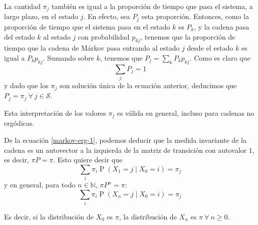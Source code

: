 \documentclass[11pt]{article}
\theoremstyle{plain}
\theoremstyle{definition}
\theoremstyle{remark}
\newcommand{\proba}{\ensuremath{\operatorname{P}}}  %
\newcommand{\espm}[0]{\ensuremath{\mathcal{S}}}  %
\newcommand{\foralle}{\ensuremath{\forall \ }}  %
\begin{document}
    La cantidad $\pi_j$ también es igual a la proporción de tiempo que pasa el sistema, a largo plazo, en el estado $j$. En efecto, sea $P_j$ esta proporción. Entonces, como la proporción de tiempo que el sistema pasa en el estado $k$ es $P_k$, y la cadena pasa del estado $k$ al estado $j$ con probabilidad $p_{kj}$, tenemos que la proporción de tiempo que la cadena de Márkov pasa entrando al estado $j$ desde el estado $k$ es igual a $P_k p_{kj}$. Sumando sobre $k$, tenemos que $P_j = \sum_k P_k p_{kj}$. Como es claro que
    \[ \sum_j P_j = 1 \]
    y dado que los $\pi_j$ son solución única de la ecuación anterior, deducimos que $P_j = \pi_j \ \foralle j \in \espm$.
    
    Esta interpretación de los valores $\pi_j$ es válida en general, incluso para cadenas no ergódicas.

    De la ecuación \eqref{markov-erg-1}, podemos deducir que la medida invariante de la cadena es un autovector a la izquierda de la matriz de transición con autovalor $1$, es decir, $ \pi P = \pi $. Esto quiere decir que
    \[ \sum_i \pi_i \proba(X_1 = j \mid X_0 = i) = \pi_j \]
    y en general, para todo $n \in \mathbb{N}$, $\pi P^n = \pi$:
    \[ \sum_i \pi_i \proba(X_n = j \mid X_0 = i) = \pi_j \]

    Es decir, si la distribución de $X_0$ es $\pi$, la distribución de $X_n$ es $\pi \ \foralle n \geq 0$.
\end{document}
